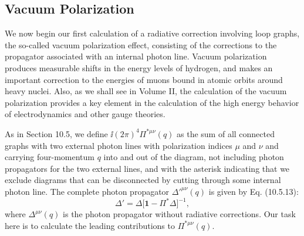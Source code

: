 
\subsection{Vacuum Polarization}

We now begin our first calculation of a radiative correction involving
loop graphs, the so-called vacuum polarization effect, consisting of the
corrections to the propagator associated with an internal photon line.
Vacuum polarization produces measurable shifts in the energy levels of
hydrogen, and makes an important correction to the energies of muons
bound in atomic orbits around heavy nuclei. Also, as we shall see in
Volume II, the calculation of the vacuum polarization provides a key
element in the calculation of the high energy behavior of electrodynamics
and other gauge theories.

\clearpage


As in Section 10.5, we define $\ii(2\pi)^4\Pi^{*\mu\nu}(q)$ as the sum of all
connected graphs with two external photon lines with polarization indices
$\mu$ and $\nu$ and carrying four-momentum $q$ into and out of the diagram,
not including photon propagators for the two external lines, and with the
asterisk indicating that we exclude diagrams that can be disconnected by
cutting through some internal photon line. The complete photon propagator
$\Delta'^{\mu\nu}(q)$ is given by Eq. (10.5.13):
\begin{equation}
  \Delta'=\Delta\bigl[\mathbf{1}-\Pi^*\Delta\bigr]^{-1},
  \tag{11.2.1}\label{eq:11.2.1}
\end{equation}
where $\Delta^{\mu\nu}(q)$ is the photon propagator without radiative
corrections. Our task here is to calculate the leading contributions to
$\Pi^{*\mu\nu}(q)$.

